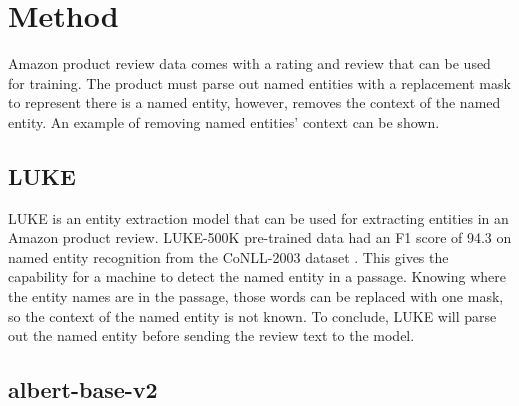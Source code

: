 \documentclass[11pt,a4paper]{article}
\begin{document}
\section{Method}

Amazon product review data comes with a rating and review that can be used for training. The product must parse out named entities with a replacement mask to represent there is a named entity, however, removes the context of the named entity. An example of removing named entities' context can be shown.



\subsection{LUKE}

LUKE is an entity extraction model that can be used for extracting entities in an Amazon product review. LUKE-500K pre-trained data had an F1 score of 94.3 on named entity recognition from the CoNLL-2003 dataset \cite{yamada-etal-2020-luke}. This gives the capability for a machine to detect the named entity in a passage. Knowing where the entity names are in the passage, those words can be replaced with one mask, so the context of the named entity is not known. To conclude, LUKE will parse out the named entity before sending the review text to the model.

\subsection{albert-base-v2}
\end{document}
